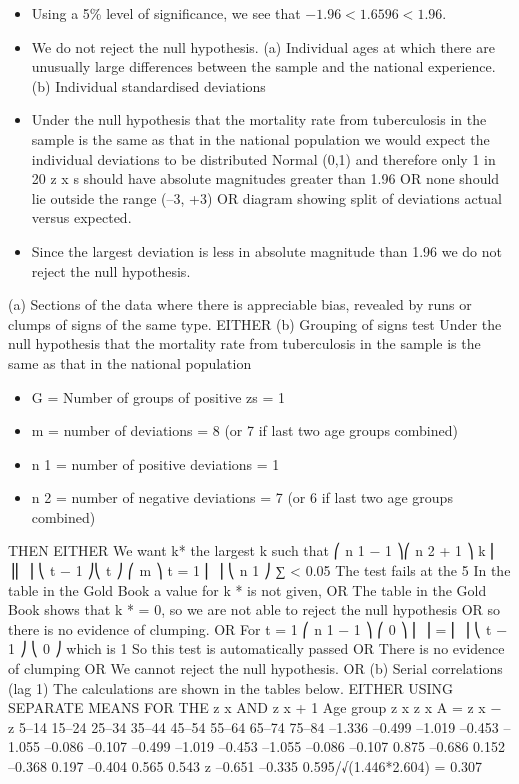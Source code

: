 \documentclass[a4paper,12pt]{article}
\begin{document}
\begin{enumerate}
\begin{itemize}
\item Using a 5\% level of significance, we see that $−1.96 < 1.6596 < 1.96$.
\item We do not reject the null hypothesis.
(a) Individual ages at which there are unusually large differences between the sample and the national experience.
(b) Individual standardised deviations
\item Under the null hypothesis that the mortality rate from tuberculosis in the sample is the same as that in the national population
we would expect the individual deviations to be distributed Normal (0,1) and therefore only 1 in 20 z x s should have absolute magnitudes greater than
1.96
OR
none should lie outside the range (–3, +3)
OR
diagram showing split of deviations actual versus expected.
\item Since the largest deviation is less in absolute magnitude than 1.96 we do not reject the null hypothesis.
\end{itemize}
(a)
Sections of the data where there is appreciable bias, revealed by runs or clumps of signs of the same type.
EITHER
(b)
Grouping of signs test
Under the null hypothesis that the mortality rate from tuberculosis in the
sample is the same as that in the national population
\begin{itemize}
\item G = Number of groups of positive zs = 1
\item m = number of deviations = 8 (or 7 if last two age groups combined)
\item n 1 = number of positive deviations = 1
\item n 2 = number of negative deviations = 7 (or 6 if last two age groups combined)
\end{itemize}

THEN EITHER
We want k* the largest k such that
⎛ n 1 − 1 ⎞⎛ n 2 + 1 ⎞
k ⎜
⎟⎜
⎟
⎝ t − 1 ⎠⎝ t ⎠
⎛ m ⎞
t = 1
⎜ ⎟
⎝ n 1 ⎠
∑
< 0.05
The test fails at the 5%
In the table in the Gold Book a value for k * is not given,
OR
The table in the Gold Book shows that k * = 0,
so we are not able to reject the null hypothesis
OR
so there is no evidence of clumping.
OR
For t = 1
⎛ n 1 − 1 ⎞ ⎛ 0 ⎞
⎜
⎟ = ⎜ ⎟
⎝ t − 1 ⎠ ⎝ 0 ⎠
which is 1
So this test is automatically passed
OR
There is no evidence of clumping
OR
We cannot reject the null hypothesis.
OR
(b)
Serial correlations (lag 1)
The calculations are shown in the tables below.
EITHER USING SEPARATE MEANS FOR THE z x AND z x + 1
Age
group z x z x A = z x − z
5–14
15–24
25–34
35–44
45–54
55–64
65–74
75–84 –1.336
–0.499
–1.019
–0.453
–1.055
–0.086
–0.107 –0.499
–1.019
–0.453
–1.055
–0.086
–0.107
0.875 –0.686
0.152
–0.368
0.197
–0.404
0.565
0.543
z –0.651 –0.335
0.595/√(1.446*2.604) = 0.307


\end{enumerate}
\end{document}
